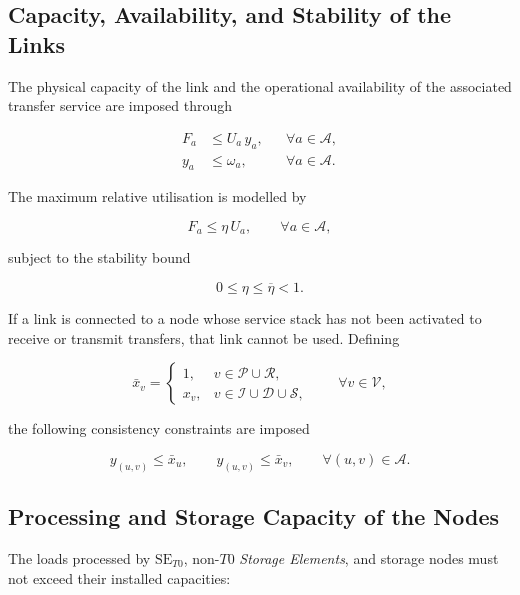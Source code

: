 \documentclass[a4paper,fleqn]{cas-dc}
\newcommand{\V}{\mathcal{V}}
\newcommand{\A}{\mathcal{A}}
\newcommand{\Pset}{\mathcal{P}}
\newcommand{\Iset}{\mathcal{I}}
\newcommand{\Dset}{\mathcal{D}}
\newcommand{\Sset}{\mathcal{S}}
\newcommand{\Rset}{\mathcal{R}}
\begin{document}
\subsection*{Capacity, Availability, and Stability of the Links}

The physical capacity of the link and the operational availability of the associated transfer service are imposed through

\begin{align}
F_a &\le U_a\,y_a,
&& \forall a\in\A,\\
y_a &\le \omega_a,
&& \forall a\in\A.
\end{align}


The maximum relative utilisation is modelled by

\begin{equation}
F_a \le \eta\,U_a,
\qquad \forall a\in\A,
\end{equation}

subject to the stability bound

\begin{equation}
\nonumber 0\le \eta \le \overline\eta < 1.
\end{equation}

If a link is connected to a node whose service stack has not been activated to receive or transmit transfers, that link cannot be used. Defining

\begin{equation}
\bar x_v=
\begin{cases}
1, & v\in\Pset\cup\Rset,\\
x_v, & v\in\Iset\cup\Dset\cup\Sset,
\end{cases}
\qquad \forall v\in\V,
\end{equation}


the following consistency constraints are imposed


\begin{equation}
y_{(u,v)} \le \bar x_u,
\qquad
y_{(u,v)} \le \bar x_v,
\qquad \forall (u,v)\in\A.
\end{equation}


\subsection*{Processing and Storage Capacity of the Nodes}

The loads processed by \(\mathrm{SE}_{T0}\), non-\(T0\) \emph{Storage Elements}, and storage nodes must not exceed their installed capacities:
\end{document}
